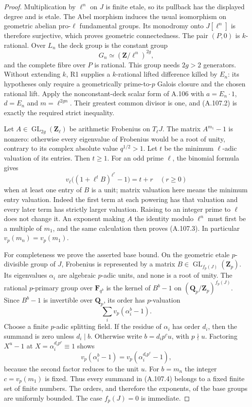 \documentclass[11pt]{article}
\begin{document}
\begin{proof}
Multiplication by $\ell^n$ on $J$ is finite etale,
so its pullback has the displayed degree and is etale.
The Abel morphism induces the usual isomorphism on
geometric abelian pro-$\ell$ fundamental groups.
Its monodromy onto $J[\ell^n]$ is therefore surjective,
which proves geometric connectedness. The pair $(P,0)$
is $k$-rational. Over $L_n$ the deck group is the
constant group
\[
                  G_n\simeq(\mathbf Z/\ell^n)^{2g},
\]
and the complete fibre over $P$ is rational. This
group needs $2g>2$ generators. Without extending $k$,
R1 supplies a $k$-rational lifted difference killed by
$E_n$: its hypotheses only require a geometrically
prime-to-$p$ Galois closure and the chosen rational
lift. Apply the nonconstant-deck scalar form of A.106 with
$a=E_n\cdot1$, $d=E_n$ and $m=\ell^{2gn}$.
Their greatest common divisor is one, and (A.107.2)
is exactly the required strict inequality.

Let $A\in\operatorname{GL}_{2g}(\mathbf Z_\ell)$
be arithmetic Frobenius on $T_\ell J$. The matrix
$A^{m_1}-1$ is nonzero: otherwise every eigenvalue
of Frobenius would be a root of unity, contrary
to its complex absolute value $q^{1/2}>1$.
Let $t$ be the minimum $\ell$-adic valuation of its
entries. Then $t\ge1$. For an odd prime $\ell$, the
binomial formula gives
\[
 v_\ell\bigl((1+\ell^t B)^{\ell^r}-1\bigr)=t+r
 \quad(r\ge0)
\]
when at least one entry of $B$ is a unit; matrix
valuation here means the minimum entry valuation.
Indeed the first term at each powering has that
valuation and every later term has strictly larger
valuation. Raising to an integer prime to $\ell$
does not change it. An exponent making $A$ the
identity modulo $\ell^n$ must first be a multiple
of $m_1$, and the same calculation then proves
(A.107.3). In particular $v_p(m_n)=v_p(m_1)$.

For completeness we prove the asserted base bound.
On the geometric etale $p$-divisible group of $J$,
Frobenius is represented by a matrix
$B\in\operatorname{GL}_{f_p(J)}(\mathbf Z_p)$.
Its eigenvalues $\alpha_i$ are algebraic $p$-adic
units, and none is a root of unity. The rational
$p$-primary group over $\mathbf F_{q^b}$ is the
kernel of $B^b-1$ on $(\mathbf Q_p/\mathbf Z_p)^{f_p(J)}$.
Since $B^b-1$ is invertible over $\mathbf Q_p$,
its order has $p$-valuation
\[
                  \sum_i v_p(\alpha_i^b-1).             \tag{A.107.4}
\]
Choose a finite $p$-adic splitting field. If the
residue of $\alpha_i$ has order $d_i$, then the
summand is zero unless $d_i\mid b$. Otherwise
write $b=d_i p^c u$, with $p\nmid u$. Factoring
$X^u-1$ at $X=\alpha_i^{d_i p^c}\equiv1$ shows
\[
 v_p(\alpha_i^b-1)=
 v_p(\alpha_i^{d_i p^c}-1),
\]
because the second factor reduces to the unit $u$.
For $b=m_n$ the integer $c=v_p(m_1)$ is fixed.
Thus every summand in (A.107.4) belongs to a fixed
finite set of finite numbers. The orders, and
therefore the exponents, of the base groups are
uniformly bounded. The case $f_p(J)=0$ is immediate.


\end{proof}
\end{document}
